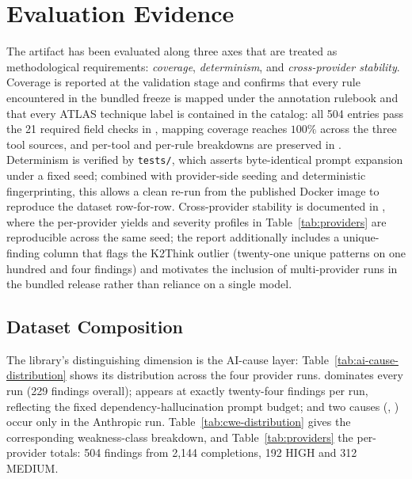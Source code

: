 \documentclass[sigconf,review,anonymous=false]{acmart}
\begin{document}
\section{Evaluation Evidence}

The artifact has been evaluated along three axes that are treated as
methodological requirements:
\emph{coverage}, \emph{determinism}, and \emph{cross-provider
stability}. Coverage is reported at the validation stage and confirms
that every rule encountered in the bundled freeze is mapped under the
annotation rulebook and that every ATLAS technique label is contained
in the catalog: all 504 entries pass the 21 required field
checks in ,
mapping coverage reaches $100\%$ across the three tool sources, and
per-tool and per-rule breakdowns are preserved in
.
Determinism is verified by
\texttt{tests/},
which asserts byte-identical prompt expansion under a fixed seed;
combined with provider-side seeding and deterministic fingerprinting,
this allows a clean re-run from the published Docker image to
reproduce the dataset row-for-row. Cross-provider stability is
documented in
, where
the per-provider yields and severity profiles in
Table~\ref{tab:providers} are reproducible across the same seed; the
report additionally includes a unique-finding column that flags the
K2Think outlier (twenty-one unique patterns on one hundred and four
findings) and motivates the inclusion of multi-provider runs in the
bundled release rather than reliance on a single model.

\subsection{Dataset Composition}

The library's distinguishing dimension is the AI-cause layer:
Table~\ref{tab:ai-cause-distribution} shows its distribution across
the four provider runs.  dominates every run
(229 findings overall);  appears at
exactly twenty-four findings per run, reflecting the fixed
dependency-hallucination prompt budget; and two causes
(, ) occur only
in the Anthropic run. Table~\ref{tab:cwe-distribution} gives the
corresponding weakness-class breakdown, and
Table~\ref{tab:providers} the per-provider totals: 504 findings from
2{,}144 completions, 192 HIGH and 312 MEDIUM.
\end{document}
